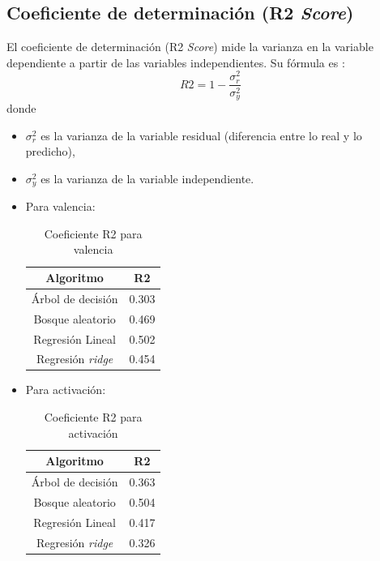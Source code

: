 \documentclass[12pt,a4paper,Spanish]{article}
\begin{document}
\subsection{Coeficiente de determinación (R2 \textit{Score})}
El coeficiente de determinación (R2 \textit{Score}) mide la varianza en la variable dependiente a  partir de las variables independientes. Su fórmula es \cite{eswiki:158364923}:
\begin{equation}
	R2 = 1 - \frac{\sigma^{2}_r}{\sigma^{2}_y} 
\end{equation}
donde
\begin{itemize}
	\item $\sigma^{2}_r$ es la varianza de la variable residual (diferencia entre lo real y lo predicho),
	\item $\sigma^{2}_y$ es la varianza de la variable independiente.
\end{itemize}
\begin{itemize}
	\item Para valencia:
	\begin{table}[H]
		\centering
		\caption{Coeficiente R2 para valencia}
		\begin{tabular}{|c|c|}
			\hline
			\textbf{Algoritmo} & \textbf{R2} \\
			\hline
			Árbol de decisión & 0.303 \\
			Bosque aleatorio & 0.469 \\
			Regresión Lineal & 0.502 \\
			Regresión \textit{ridge} & 0.454 \\
			\hline
		\end{tabular}
	\end{table}
	\item Para activación:
	\begin{table}[H]
		\centering
		\caption{Coeficiente R2 para activación}
		\begin{tabular}{|c|c|}
			\hline
			\textbf{Algoritmo} & \textbf{R2} \\
			\hline
			Árbol de decisión & 0.363 \\
			Bosque aleatorio & 0.504 \\
			Regresión Lineal & 0.417 \\
			Regresión \textit{ridge} & 0.326 \\
			\hline
		\end{tabular}
	\end{table}
\end{itemize}
\end{document}
